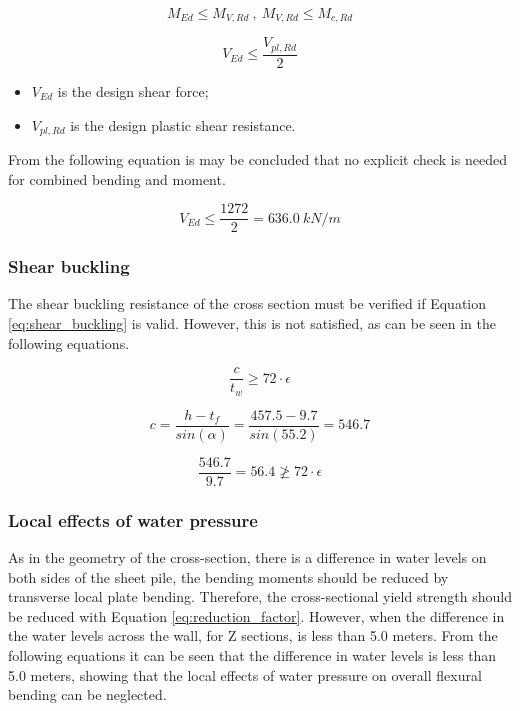 \begin{equation}
    M_{Ed} \leq M_{V,Rd} \ , \ M_{V,Rd} \leq M_{c,Rd}
    \label{eq:combi_shear_bending}
\end{equation}

\begin{equation}
    V_{Ed} \leq \frac{V_{pl,Rd}}{2}
    \label{eq:combi_2_shear_bending}
\end{equation}

\begin{itemize}
  \item $V_{Ed}$ is the design shear force;
  \item $V_{pl,Rd}$ is the design plastic shear resistance.
\end{itemize}

From the following equation is may be concluded that no explicit check is needed for combined bending and moment. 

$$
    V_{Ed} \leq \frac{1272}{2} = 636.0 \ kN/m 
$$

\subsubsection{Shear buckling}

The shear buckling resistance of the cross section must be verified if Equation \ref{eq:shear_buckling} is valid. However, this is not satisfied, as can be seen in the following equations.

\begin{equation}
    \frac{c}{t_{w}} \geq 72 \cdot \epsilon
    \label{eq:shear_buckling}
\end{equation}

$$
    c = \frac{h - t_{f}}{sin(\alpha)} = \frac{457.5 - 9.7}{sin(55.2)} = 546.7 
$$

$$
    \frac{546.7}{9.7} = 56.4 \ngeq 72 \cdot \epsilon 
    \label{eq:no_shear_buckling}
$$

\subsubsection{Local effects of water pressure}

As in the geometry of the cross-section, there is a difference in water levels on both sides of the sheet pile, the bending moments should be reduced by transverse local plate bending. Therefore, the cross-sectional yield strength should be reduced with Equation \ref{eq:reduction_factor}. However, when the difference in the water levels across the wall, for Z sections, is less than 5.0 meters. From the following equations it can be seen that the difference in water levels is less than 5.0 meters, showing that the local effects of water pressure on overall flexural bending can be neglected. 

